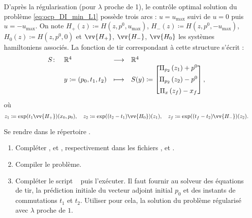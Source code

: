 D'apr\`es la r\'egularisation (pour $\lambda$ proche de 1), le contr\^ole optimal solution du probl\`eme \eqref{eq:ocp_DI_min_L1}
poss\`ede trois arcs : $u=u_\mathrm{max}$ suivi de $u=0$ puis $u=-u_\mathrm{max}$.
On note $H_+(z) \coloneqq H(z, p^0, u_\mathrm{max})$, $H_-(z) \coloneqq H(z, p^0, -u_\mathrm{max})$, $H_0(z) \coloneqq H(z, p^0, 0)$
et $\vv{H_+}$, $\vv{H_-}$, $\vv{H_0}$ les syst\`emes hamiltoniens associ\'es.
La fonction de tir correspondant \`a cette structure s'\'ecrit :
\begin{equation*}
    \begin{array}{rlll}
        S \colon    & \mathbb{R}^4          & \longrightarrow   & \mathbb{R}^4 \\
        & y\coloneqq(p_0, t_1, t_2) & \longmapsto       & S(y) \coloneqq
        \begin{bmatrix}
            \Pi_{p_2}\left( z_1 \right) + p^0   \\[0.5em]
            \Pi_{p_2}\left( z_2 \right) - p^0   \\[0.5em]
            \Pi_x\left( z_f \right) - x_f
        \end{bmatrix},
    \end{array}
\end{equation*}
o\`u
\[
    z_1 \coloneqq \expmap{x_0,p_0}{t_1}{\vv{H_+}}, \quad z_2 \coloneqq \expmap{z_1}{(t_2-t_1)}{\vv{H_0}},
    \quad z_f \coloneqq \expmap{z_2}{(t_f-t_2)}{\vv{H_-}}.
\]

\begin{myExercice} Se rendre dans le r\'epertoire .
    \begin{enumerate}
        \item Compl\'eter ,  et , respectivement dans les fichiers ,  et .
        \item Compiler le probl\`eme.
        \item Compl\'eter le script \matlab\  puis l'ex\'ecuter. Il faut fournir au solveur des \'equations de tir, la pr\'ediction
            initiale du vecteur adjoint initial $p_0$ et des instants de commutations $t_1$ et $t_2$. Utiliser pour cela, la solution du probl\`eme 
            r\'egularis\'e avec $\lambda$ proche de $1$.
    \end{enumerate}
\end{myExercice}

